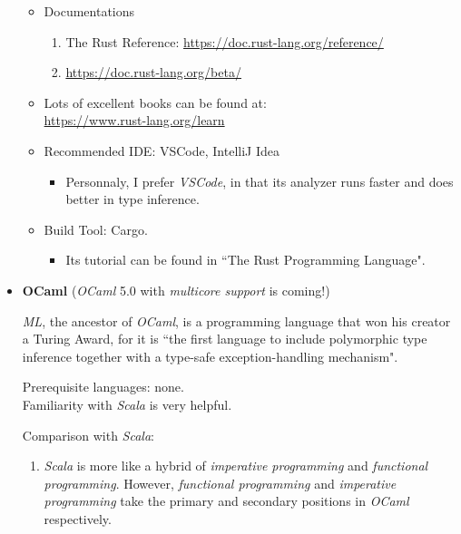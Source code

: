 \documentclass{article}
\begin{document}
\begin{itemize}
\begin{itemize}
\begin{enumerate}
        \end{enumerate}
        \item Documentations
        \begin{enumerate}
            \item The Rust Reference:
            \href{https://doc.rust-lang.org/reference/}{https://doc.rust-lang.org/reference/}
            \item \href{https://doc.rust-lang.org/beta/}{https://doc.rust-lang.org/beta/}
        \end{enumerate}
        \item Lots of excellent books can be found at:\\
        \href{https://www.rust-lang.org/learn}{https://www.rust-lang.org/learn}
        \item Recommended IDE: VSCode, IntelliJ Idea
        \begin{itemize}
            \item Personnaly, I prefer \emph{VSCode}, in that its analyzer runs faster and does better in type inference.
        \end{itemize}
        \item Build Tool: Cargo.
        \begin{itemize}
            \item Its tutorial can be found in ``The Rust Programming Language".
        \end{itemize}
    \end{itemize}

    \item \textbf{OCaml} (\emph{OCaml} 5.0 with \emph{multicore support} is coming!)
    
    \emph{ML}, the ancestor of \emph{OCaml}, is a programming language that won his creator a Turing Award, for it is ``the first language to include polymorphic type inference together with a type-safe exception-handling mechanism".
    
    Prerequisite languages: none.\\
    Familiarity with \emph{Scala} is very helpful.
    
    Comparison with \emph{Scala}:
    \begin{enumerate}
        \item \emph{Scala} is more like a hybrid of \emph{imperative programming} and \emph{functional programming}.
        However, \emph{functional programming} and \emph{imperative programming} take the primary and secondary positions in \emph{OCaml} respectively.
        

\end{enumerate}
\end{itemize}
\end{document}
